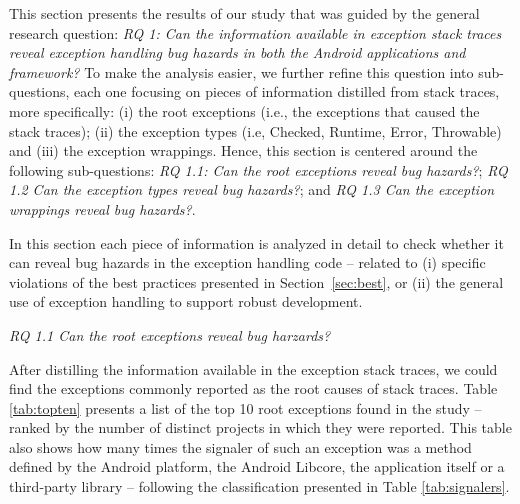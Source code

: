 This section presents the results of our study that was guided by the general research question:
 \emph{RQ 1: Can the information available in exception stack traces reveal exception handling
bug hazards in both the Android applications and framework?}
To make the analysis easier, we further refine this question into sub-questions, each one focusing on pieces of information
 distilled from stack traces, more specifically: (i) the root exceptions (i.e., the exceptions that caused the stack traces);
 (ii) the exception types (i.e, Checked, Runtime, Error, Throwable) and (iii) the exception wrappings.
Hence, this section is centered around the following sub-questions:  \emph{RQ 1.1: Can the root exceptions reveal bug hazards?};
 \emph{RQ 1.2 Can the exception types reveal bug hazards?}; and  \emph{RQ 1.3 Can the exception wrappings reveal bug hazards?}.

In this section each piece of information is analyzed in detail to
check whether it can reveal bug hazards in the exception handling code --
related to (i) specific violations of the best practices presented in Section~\ref{sec:best},
or (ii) the general use of exception handling to support robust development.

\bigskip

\noindent\emph{RQ 1.1 Can the root exceptions reveal bug harzards?}

\bigskip

After distilling the information available in the exception stack traces, we could find
the exceptions commonly reported as the root causes of stack traces.
Table \ref{tab:topten} presents a list of the top 10 root exceptions found in the study --
 ranked by the number of distinct projects in which they were reported.
This table also shows how many times the signaler of such an exception was a method defined by
the Android platform, the Android Libcore, the application itself or a third-party library --
 following the classification presented in Table  \ref{tab:signalers}.


